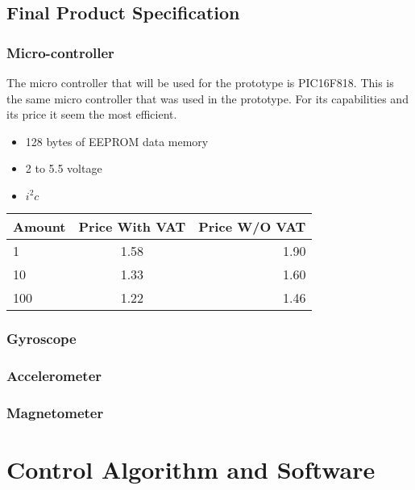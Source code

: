 \documentclass{report}
\begin{document}
\section{Final Product Specification}

\subsection{Micro-controller}
The micro controller that will be used for the prototype is PIC16F818. This is the same micro controller that was used in the prototype. For its capabilities and its price it seem the most efficient.
\begin{itemize}
\item 128 bytes of EEPROM data memory
\item 2 to 5.5 voltage
\item $i^2c$
\end{itemize}
\begin{center}
  \begin{tabular}{ |l | c | r |}
    \hline
    Amount & Price With VAT & Price W/O VAT \\ \hline
    1 & 1.58 & 1.90 \\ \hline
    10 & 1.33 & 1.60 \\ \hline
    100 & 1.22 & 1.46   \\ \hline
  \end{tabular}
\end{center}

\subsection{Gyroscope}

\subsection{Accelerometer}

\subsection{Magnetometer}




\chapter{Control Algorithm and Software}


 
\end{document}
